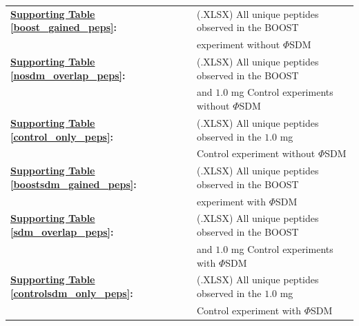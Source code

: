 \documentclass[journal=jprobs,manuscript=article]{achemso}
\begin{document}
\begin{table}[h!]
    \begin{tabular}{ll}

        \textbf{\hyperref[boost_gained_peps]{Supporting Table} \ref{boost_gained_peps}:} & (.XLSX) All unique peptides observed in the BOOST \\
                                                                                                                                                  & experiment without $\Phi$SDM \\

	\textbf{\hyperref[nosdm_overlap_peps]{Supporting Table} \ref{nosdm_overlap_peps}:} & (.XLSX) All unique peptides observed in the BOOST \\
                                                                                                                                                         & and $1.0$ mg Control experiments without $\Phi$SDM \\
	\textbf{\hyperref[control_only_peps]{Supporting Table} \ref{control_only_peps}:} & (.XLSX) All unique peptides observed in the $1.0$ mg \\
                                                                                                                                                  & Control experiment without $\Phi$SDM \\

	\textbf{\hyperref[boostsdm_gained_peps]{Supporting Table} \ref{boostsdm_gained_peps}:} & (.XLSX) All unique peptides observed in the BOOST \\
                                                                                                                                                  & experiment with $\Phi$SDM \\

	\textbf{\hyperref[sdm_overlap_peps]{Supporting Table} \ref{sdm_overlap_peps}:} & (.XLSX) All unique peptides observed in the BOOST \\
                                                                                                                                                         & and $1.0$ mg Control experiments with $\Phi$SDM \\

	\textbf{\hyperref[controlsdm_only_peps]{Supporting Table} \ref{controlsdm_only_peps}:} & (.XLSX) All unique peptides observed in the $1.0$ mg\\
                                                                                                                                                  & Control experiment with $\Phi$SDM \\


\end{tabular}
\end{table}
\end{document}
